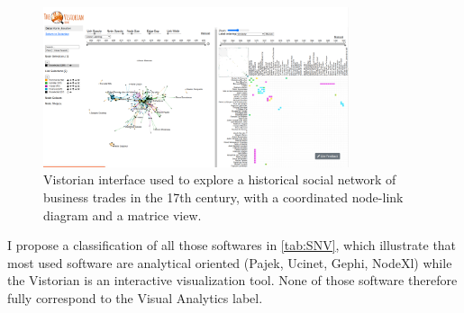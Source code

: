 \begin{figure}
    \centering %
    \includegraphics[width=0.8\textwidth,trim={0 1cm 0 0},clip]{static/figures/RelatedWork/vistorian}
    \caption{Vistorian interface\cite{serranomolineroUnderstandingUseVistorian2017} used to explore a historical social network of business trades in the 17th century, with a coordinated node-link diagram and a matrice view.}
    \label{fig:vistorian}
\end{figure}

I propose a classification of all those softwares in \ref{tab:SNV}, which illustrate that most used software are analytical oriented (Pajek, Ucinet, Gephi, NodeXl) while the Vistorian is an interactive visualization tool.
None of those software therefore fully correspond to the Visual Analytics label\cite{keimVisualAnalytics}.

\begin{table}[]
\centering
{}
    \caption{NodeTrix system showing a scientific collaboration social network with clusters. Each cluster is represented as a matrix,  Image from \cite{henryNodeTrixHybridVisualization2007}.}
    \label{tab:SNV}
\end{table}

